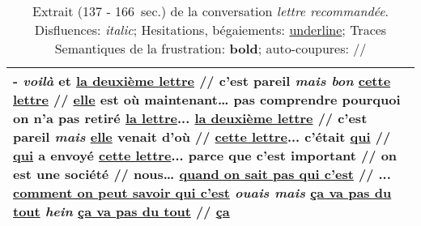 \begin{table}[h]
    \centering
    \begin{tabular}{|p{}|}
      \hline
    - \textit{voilà} et \underline{la deuxième lettre}  // c'est pareil \textit{mais bon} \underline{cette lettre}  // \underline{elle} est où maintenant… pas comprendre pourquoi on n'a pas retiré \underline{la lettre}... \underline{la deuxième lettre}  // c'est pareil \textit{mais} \underline{elle} venait d'où  // \underline{cette lettre}... c’était \underline{qui}  // \underline{qui} a envoyé \underline{cette lettre}... parce que c'est important  // on est une société  // nous… \underline{quand on sait pas qui c'est} // ... \underline{comment on peut savoir qui c'est} \textit{ouais mais} \underline{\textbf{ça va pas du tout}} \textit{hein} \underline{\textbf{ça va pas du tout}}  // \underline{ça}
    \\ \hline
    \end{tabular}
    \caption{Extrait (137 - 166~sec.) de la conversation \textit{lettre recommandée}. Disfluences: \textit{italic}; Hesitations, bégaiements: \underline{underline}; Traces Semantiques de la frustration: \textbf{bold}; auto-coupures: //}
    \label{tab:ex_transcription}
\end{table}
